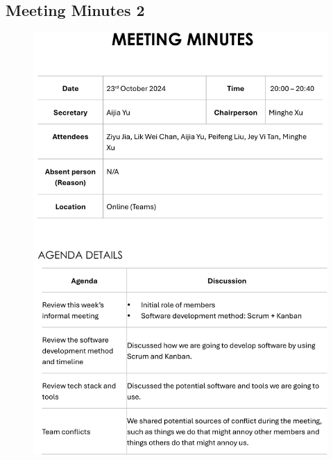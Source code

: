 \documentclass[a4paper,12pt, oneside]{report}
\begin{document}
\begin{appendices}
\section{Meeting Minutes 2}
\begin{figure}[H]
    \centering
    \includegraphics[width=\textwidth]{Minutes/Minutes_2-cropped-1.png}
\end{figure}
\newpage
\begin{figure}[H]
    \centering

\end{figure}
\end{appendices}
\end{document}

